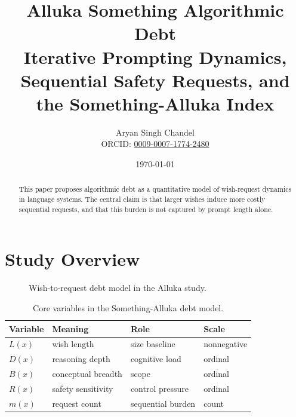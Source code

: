 \documentclass[11pt]{article}
\title{Alluka Something Algorithmic Debt\\\large Iterative Prompting Dynamics, Sequential Safety Requests, and the Something-Alluka Index}
\author{Aryan Singh Chandel\\\small ORCID: \href{https://orcid.org/0009-0007-1774-2480}{0009-0007-1774-2480}}
\date{\today}
\begin{document}
\maketitle

\begin{abstract}
This paper proposes algorithmic debt as a quantitative model of wish-request dynamics in language systems. The central claim is that larger wishes induce more costly sequential requests, and that this burden is not captured by prompt length alone.
\end{abstract}

\section{Study Overview}
\begin{figure}[h]
\centering
{}
\caption{Wish-to-request debt model in the Alluka study.}
\end{figure}

\begin{table}[h]
\centering
\begin{tabular}{llll}
\toprule
Variable & Meaning & Role & Scale \\
\midrule
$L(x)$ & wish length & size baseline & nonnegative \\
$D(x)$ & reasoning depth & cognitive load & ordinal \\
$B(x)$ & conceptual breadth & scope & ordinal \\
$R(x)$ & safety sensitivity & control pressure & ordinal \\
$m(x)$ & request count & sequential burden & count \\
\bottomrule
\end{tabular}
\caption{Core variables in the Something-Alluka debt model.}
\end{table}
\end{document}
